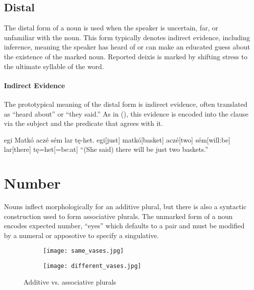 \subsection{Distal}
The distal form of a noun is used when the speaker is uncertain, far, or unfamiliar with the noun. 
This form typically denotes indirect evidence, including inference, meaning the speaker has heard of or can make an educated guess about the existence of the marked noun. Reported deixis is marked by shifting stress to the ultimate syllable of the word.

\paragraph{Indirect Evidence}
The prototypical meaning of the distal form is indirect evidence, often translated as “heard about” or “they said.” As in (\nextx), this evidence is encoded into the clause via the subject and the predicate that agrees with it.

\begin{gloss*}
    \begingl
        \glpreamble egi Matkó aczé sém lar tę-het.\endpreamble
            egi[just]
            matkó[basket\tbs{}]
            aczé[two\tbs{}]
            sém[will:be\tbs{}]
            lar[there]
            tę=het[=be:at]
        \glft “(She said) there will be just two baskets.”
    \endgl
\end{gloss*}

\section{Number}
Nouns inflect morphologically for an additive plural, but there is also a syntactic construction used to form associative plurals. The unmarked form of a noun encodes expected number, \eg {} “eyes” which defaults to a pair and must be modified by a numeral or apposotive to specify a singulative. 

\begin{figure}[h]
    \centering
    \begin{subfigure}{0.4\textwidth}
        \centering
        \texttt{[image: same\_vases.jpg]}
        \caption{}
    \end{subfigure}
    \begin{subfigure}{0.4\textwidth}
        \centering
        \texttt{[image: different\_vases.jpg]}
        \caption{}
    \end{subfigure}
    \caption{Additive vs. associative plurals}
\end{figure}

